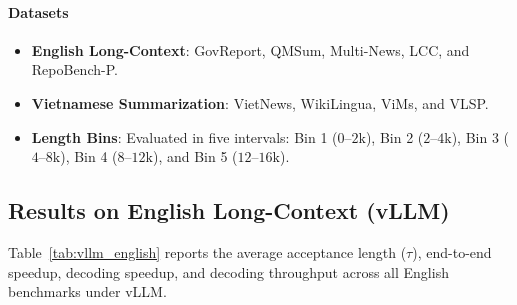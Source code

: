 \documentclass[11pt]{article}
\begin{document}
\paragraph{Datasets}
\begin{itemize}
    \item \textbf{English Long-Context}: GovReport, QMSum, Multi-News, LCC, and RepoBench-P.
    \item \textbf{Vietnamese Summarization}: VietNews, WikiLingua, ViMs, and VLSP.
    \item \textbf{Length Bins}: Evaluated in five intervals: Bin 1 ($0\text{--}2\text{k}$), Bin 2 ($2\text{--}4\text{k}$), Bin 3 ($4\text{--}8\text{k}$), Bin 4 ($8\text{--}12\text{k}$), and Bin 5 ($12\text{--}16\text{k}$).
\end{itemize}

\subsection{Results on English Long-Context (vLLM)}

Table~\ref{tab:vllm_english} reports the average acceptance length ($\tau$), end-to-end speedup, decoding speedup, and decoding throughput across all English benchmarks under vLLM.
\end{document}

